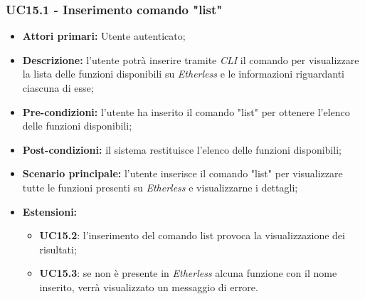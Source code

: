 \subsubsection{UC15.1 - Inserimento comando "list"}
\begin{itemize}
	\item \textbf{Attori primari:} Utente autenticato;
	\item \textbf{Descrizione:} l'utente potrà inserire tramite \textit{CLI\glo} il comando per visualizzare la lista delle funzioni disponibili su \textit{Etherless} e le informazioni riguardanti ciascuna di esse;
	\item \textbf{Pre-condizioni:} l'utente ha inserito il comando "list" per ottenere l'elenco delle funzioni disponibili;
	\item \textbf{Post-condizioni:} il sistema restituisce l'elenco delle funzioni disponibili;
	\item \textbf{Scenario principale:} l'utente inserisce il comando "list" per visualizzare tutte le funzioni presenti su \textit{Etherless} e visualizzarne i dettagli;
	\item \textbf{Estensioni:}
	\begin{itemize}
		\item \textbf{UC15.2}: l'inserimento del comando list provoca la visualizzazione dei risultati;
		\item \textbf{UC15.3}: se non è presente in \textit{Etherless} alcuna funzione con il nome inserito, verrà visualizzato un messaggio di errore.
	\end{itemize}
\end{itemize}